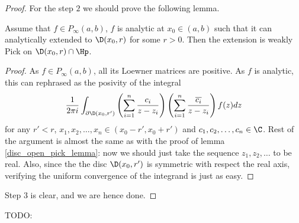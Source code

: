 \begin{proof}
	For the step $2$ we should prove the following lemma.
	\begin{lem}
		Assume that $f \in P_{\infty}(a, b)$, $f$ is analytic at $x_{0} \in (a, b)$ such that it can analytically extended to $\D(x_{0}, r)$ for some $r > 0$. Then the extension is weakly Pick on $\D(x_{0}, r) \cap \Hp$.
	\end{lem}
	\begin{proof}
		As $f \in P_{\infty}(a, b)$, all its Loewner matrices are positive. As $f$ is analytic, this can rephrased as the posivity of the integral
		\begin{align*}
			\frac{1}{2 \pi i} \int_{\partial \D(x_{0}, r')}\left(\sum_{i = 1}^{n} \frac{c_{i}}{z - z_{i}} \right) \left(\sum_{i = 1}^{n} \frac{\overline{c_{i}}}{z - z_{i}} \right) f(z) dz
		\end{align*}
		for any $r' < r$, $x_{1}, x_{2}, \ldots, x_{n} \in (x_{0} - r', x_{0} + r')$ and $c_{1}, c_{2}, \ldots, c_{n} \in \C$. Rest of the argument is almost the same as with the proof of lemma \ref{disc_open_pick_lemma}: now we should just take the sequence $z_{1}, z_{2}, \ldots$ to be real. Also, since the the disc $\D(x_{0}, r')$ is symmetric with respect the real axis, verifying the uniform convergence of the integrand is just as easy.
	\end{proof}

	Step $3$ is clear, and we are hence done.

\end{proof}


TODO:

